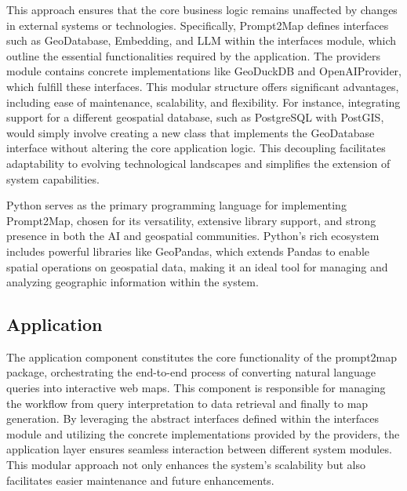 This approach ensures that the core business logic remains unaffected by changes in external systems or technologies. Specifically, Prompt2Map defines interfaces such as GeoDatabase, Embedding, and LLM within the interfaces module, which outline the essential functionalities required by the application. The providers module contains concrete implementations like GeoDuckDB and OpenAIProvider, which fulfill these interfaces. This modular structure offers significant advantages, including ease of maintenance, scalability, and flexibility. For instance, integrating support for a different geospatial database, such as PostgreSQL with PostGIS, would simply involve creating a new class that implements the GeoDatabase interface without altering the core application logic. This decoupling facilitates adaptability to evolving technological landscapes and simplifies the extension of system capabilities.

Python serves as the primary programming language for implementing Prompt2Map, chosen for its versatility, extensive library support, and strong presence in both the AI and geospatial communities. Python's rich ecosystem includes powerful libraries like GeoPandas, which extends Pandas to enable spatial operations on geospatial data, making it an ideal tool for managing and analyzing geographic information within the system.

\subsection{Application}
The application component constitutes the core functionality of the prompt2map package, orchestrating the end-to-end process of converting natural language queries into interactive web maps. This component is responsible for managing the workflow from query interpretation to data retrieval and finally to map generation. By leveraging the abstract interfaces defined within the interfaces module and utilizing the concrete implementations provided by the providers, the application layer ensures seamless interaction between different system modules. This modular approach not only enhances the system's scalability but also facilitates easier maintenance and future enhancements.

